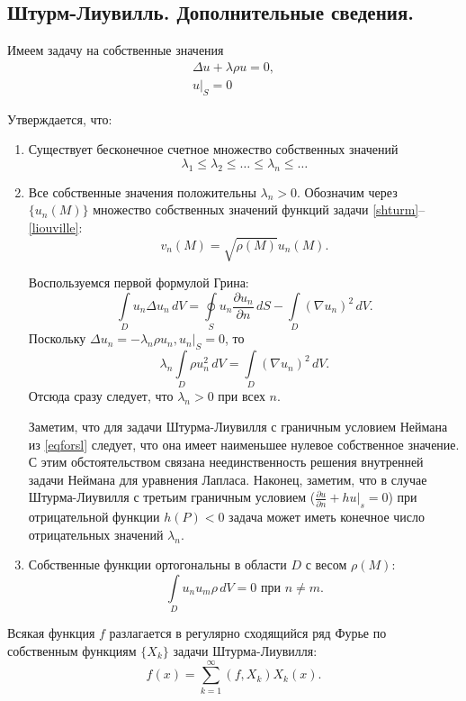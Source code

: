\subsection{Штурм-Лиувилль. Дополнительные сведения.}

Имеем задачу на собственные значения 
\begin{align}
	\Delta u + \lambda \rho u = 0, \label{shturm} \\
	u|_{S} = 0 \label{liouville}
\end{align}

Утверждается, что:
\begin{enumerate}
	\item Существует бесконечное счетное множество собственных значений
	\begin{equation}
		\lambda_1 \leqslant \lambda_2 \leqslant \dotsc \leqslant \lambda_n \leqslant \dotsc
	\end{equation}
	
	\item Все собственные значения положительны $\lambda_n > 0$. Обозначим через $\{u_n(M)\}$ множество собственных значений функций задачи \eqref{shturm}--\eqref{liouville}:
	\begin{equation*}
		v_n(M) = \sqrt{\rho(M)} u_n(M).
	\end{equation*}
	
	Воспользуемся первой формулой Грина:
	\begin{equation*}
		\int \limits_{D} u_n \Delta u_n \, dV = \oint \limits_{S} u_n \frac{\partial u_n}{\partial n} \, dS - \int \limits_{D} (\nabla u_n)^2 \, dV.
	\end{equation*}
	Поскольку $\Delta u_n = - \lambda_n \rho u_n, u_n|_{S} = 0$, то 
	\begin{equation} \label{eqforsl}
		\lambda_n \int \limits_{D} \rho u_n^2 \, dV = \int \limits_{D} (\nabla u_n)^2 \, dV.
	\end{equation}
	Отсюда сразу следует, что $\lambda_n > 0$ при всех $n$. 
	
	Заметим, что для задачи Штурма-Лиувилля с граничным условием Неймана из \eqref{eqforsl} следует, что она имеет наименьшее нулевое собственное значение. С этим обстоятельством связана неединственность решения внутренней задачи Неймана для уравнения Лапласа. Наконец, заметим, что в случае Штурма-Лиувилля с третьим граничным условием ($\frac{\partial u}{\partial n} + h u |_{s} = 0$) при отрицательной функции $h(P) < 0$ задача может иметь конечное число отрицательных значений $\lambda_n$. 
	
	\item Собственные функции ортогональны в области $D$ с весом $\rho(M)$:
	\begin{equation}
		\int \limits_{D} u_n u_m \rho \, dV = 0 \text{ при } n \not = m.
	\end{equation}
\end{enumerate}

\begin{theorem}[В.А. Стеклов]
	Всякая функция $f$ разлагается в регулярно сходящийся ряд Фурье по собственным функциям $\{X_k\}$ задачи Штурма-Лиувилля:
	\begin{equation*}
		f(x) = \sum \limits_{k = 1}^{\infty} (f, X_k) X_k(x).
	\end{equation*}
\end{theorem}
